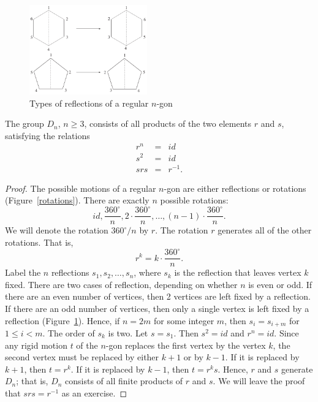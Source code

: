  
 
 
\begin{figure}[hbt]
\begin{center}
\centerline {
\includegraphics[width=2in]{types}
}
\end{center}
\caption{Types of  reflections of a regular $n$-gon}
\label{types}
\end{figure}
 
 
 
\begin{theorem}
The group $D_n$, $n \geq 3$, consists of all products of the two 
elements $r$ and $s$, satisfying the relations
\begin{eqnarray*}
r^n & = & id \\
s^2 & = & id \\
srs & = & r^{-1}.
\end{eqnarray*}
\end{theorem}
 
 
 
\begin{proof}
The possible motions of a regular $n$-gon are either reflections or 
rotations (Figure~\ref{rotations}). There are exactly $n$ possible
rotations:
$$
id, \frac{360^{\circ} }{n}, 2 \cdot \frac{360^{\circ} }{n},
\ldots, (n-1) \cdot \frac{360^{\circ} }{n}.
$$
We will denote the rotation $360^{\circ} /n$ by $r$. The rotation $r$
generates all  of the other rotations. That is,
$$
r^k = k \cdot \frac{360^{\circ} }{n}.
$$
Label the $n$ reflections $s_1, s_2, \ldots, s_n$, where $s_k$ is the 
reflection that leaves vertex $k$ fixed. There are two cases of 
reflection, depending on whether $n$ is even or odd. If there are an 
even number of vertices, then 2 vertices are left fixed by a 
reflection. If there are an odd number of vertices, then only a single 
vertex is left fixed by a reflection (Figure~\ref{types}). Hence, if
$n = 2m$ for some integer $m$, then $s_i = s_{i+m}$ for $1 \leq i <
m$. The order of $s_k$ is two. Let $s = s_1$. Then $s^2 = id$ and 
$r^n = id$. Since any rigid motion $t$ of the $n$-gon replaces the 
first vertex by the vertex $k$, the second vertex must be replaced 
by either $k+1$ or by $k-1$. If it is replaced by $k+1$, then $t = r^k$.
If it is replaced by $k-1$, then $t = r^k s$. Hence, $r$ and $s$
generate $D_n$; that is, $D_n$ consists of all finite products of $r$
and $s$. We will leave the proof that $srs = r^{-1}$ as an exercise.
\end{proof}
 
